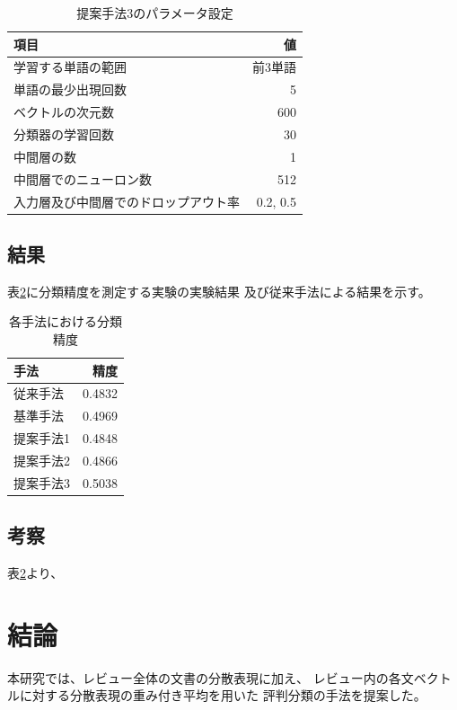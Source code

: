 \documentclass[twocolumn,a4paper]{ltjarticle}
\begin{document}
\begin{table}
  \caption{提案手法3のパラメータ設定}
  \begin{tabular}{l | r}\label{tab:ParametersOfMyMethod3}
    項目 & 値 \\
    \hline
    学習する単語の範囲 & 前3単語 \\
    単語の最少出現回数 & 5 \\
    ベクトルの次元数 & 600 \\
    分類器の学習回数 & 30 \\
    中間層の数 & 1 \\
    中間層でのニューロン数 & 512 \\
    入力層及び中間層でのドロップアウト率 & 0.2, 0.5 \\
  \end{tabular}
\end{table}


\subsection{結果}

表\ref{tab:Accuracies}に分類精度を測定する実験の実験結果
及び従来手法による結果を示す。

\begin{table}
  \caption{各手法における分類精度}
  \begin{tabular}{l | r}\label{tab:Accuracies}
    手法 & 精度 \\
    \hline
    従来手法  & 0.4832 \\
    基準手法  & 0.4969 \\
    提案手法1 & 0.4848 \\
    提案手法2 & 0.4866 \\
    提案手法3 & 0.5038 \\
  \end{tabular}
\end{table}

\subsection{考察}

表\ref{tab:Accuracies}より、



\section{結論}

本研究では、レビュー全体の文書の分散表現に加え、
レビュー内の各文ベクトルに対する分散表現の重み付き平均を用いた
評判分類の手法を提案した。
\end{document}
